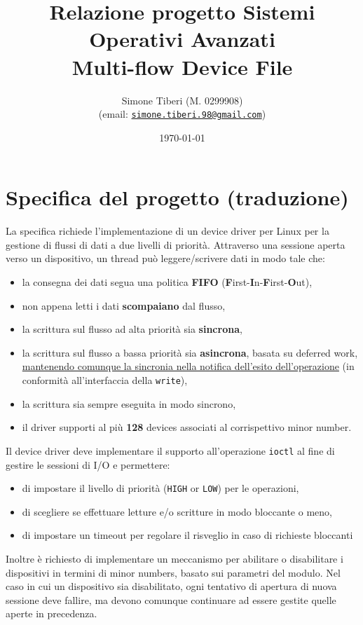 \documentclass{article}
\title{\small Relazione progetto Sistemi Operativi Avanzati \\
\Huge \textbf{Multi-flow Device File}}
\author{Simone Tiberi (M. 0299908)\\%
(email: \texttt{\href{mailto:simone.tiberi.98@gmail.com}{simone.tiberi.98@gmail.com}})}
\date{\today}
\begin{document}
\maketitle

\section*{Specifica del progetto (traduzione)}
La specifica richiede l'implementazione di un device driver per Linux per la gestione di flussi di dati a due livelli di priorità. Attraverso una sessione aperta verso un dispositivo, un thread può leggere/scrivere dati in modo tale che:
\begin{itemize}
        \item la consegna dei dati segua una politica \textbf{FIFO} (\textbf{F}irst-\textbf{I}n-\textbf{F}irst-\textbf{O}ut),
        \item non appena letti i dati \textbf{scompaiano} dal flusso,
        \item la scrittura sul flusso ad alta priorità sia \textbf{sincrona},
        \item la scrittura sul flusso a bassa priorità sia \textbf{asincrona}, basata su deferred work, \ul{mantenendo comunque la sincronia nella notifica dell'esito dell'operazione} (in conformità all'interfaccia della \texttt{write}),
        \item la scrittura sia sempre eseguita in modo sincrono,
        \item il driver supporti al più \textbf{128} devices associati al corrispettivo minor number.
\end{itemize}

Il device driver deve implementare il supporto all'operazione \texttt{ioctl} al fine di gestire le sessioni di I/O e permettere:
\begin{itemize}
        \item di impostare il livello di priorità (\texttt{HIGH} or \texttt{LOW}) per le operazioni,
        \item di scegliere se effettuare letture e/o scritture in modo bloccante o meno,
        \item di impostare un timeout per regolare il risveglio in caso di richieste bloccanti
\end{itemize}

Inoltre è richiesto di implementare un meccanismo per abilitare o disabilitare i dispositivi in termini di minor numbers, basato sui parametri del modulo. Nel caso in cui un dispositivo sia disabilitato, ogni tentativo di apertura di nuova sessione deve fallire, ma devono comunque continuare ad essere gestite quelle aperte in precedenza.
\end{document}
